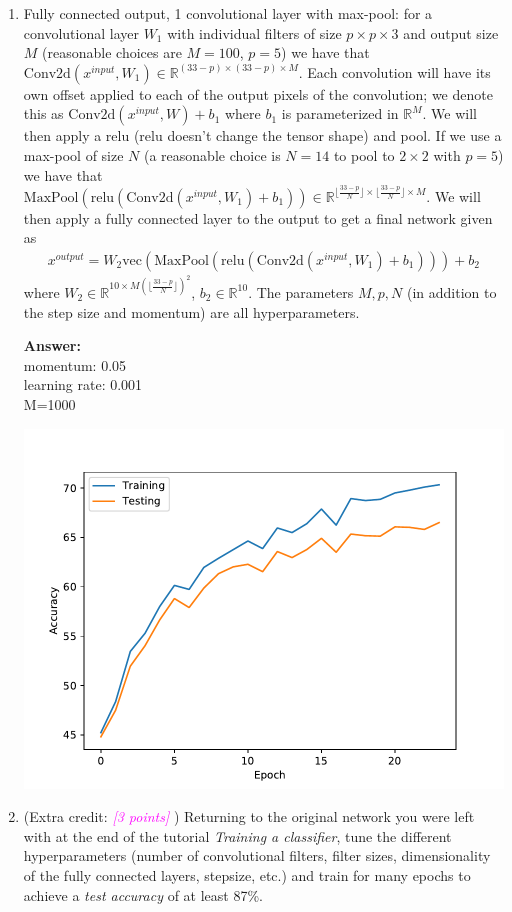\documentclass{article}
\newcommand{\field}[1]{\mathbb{#1}}
\newcommand{\1}{\mathbf{1}}
\newcommand{\R}{\field{R}} %
\def\vec{\text{vec}}
\newcommand{\grade}[1]{\small\textcolor{magenta}{\emph{[#1 points]}} \normalsize}
\begin{document}
\begin{enumerate}
  \item Fully connected output, 1 convolutional layer with max-pool: for a convolutional layer $W_1$ with individual filters of size $p \times p \times 3$ and output size $M$ (reasonable choices are $M=100$, $p=5$) we have that $\mathrm{Conv2d}(x^{input}, W_1) \in \R^{(33-p) \times (33-p) \times M}$. 
  Each convolution will have its own offset applied to each of the output pixels of the convolution; we denote this as $\mathrm{Conv2d}(x^{input}, W) + b_1$ where $b_1$ is parameterized in $\R^M$.
  We will then apply a relu (relu doesn't change the tensor shape) and pool. 
  If we use a max-pool of size $N$ (a reasonable choice is $N=14$ to pool to $2 \times 2$ with $p=5$) we have that $\textrm{MaxPool}( \mathrm{relu}( \mathrm{Conv2d}(x^{input}, W_1)+b_1)) \in \R^{\lfloor\frac{33-p}{N}\rfloor \times \lfloor\frac{33-p}{N}\rfloor \times M}$.
  We will then apply a fully connected layer to the output to get a final network given as
  \begin{align*}
  x^{output} = W_2 \vec(\textrm{MaxPool}( \mathrm{relu}( \mathrm{Conv2d}(x^{input}, W_1)+b_1))) + b_2
  \end{align*}
  where $W_2 \in \R^{10 \times M (\lfloor\frac{33-p}{N}\rfloor)^2}$, $b_2 \in \R^{10}$.
  The parameters $M,p,N$ (in addition to the step size and momentum) are all hyperparameters.
  
   \textbf{Answer:}\\
  momentum: 0.05\\
  learning rate: 0.001\\
  M=1000
  
  \includegraphics[]{3_convNet.pdf}
  
  \item (Extra credit: \grade{3}) Returning to the original network you were left with at the end of the tutorial \emph{Training a classifier}, tune the different hyperparameters (number of convolutional filters, filter sizes, dimensionality of the fully connected layers, stepsize, etc.) and train for many epochs to achieve a \emph{test accuracy} of at least 87\%. 
\end{enumerate}
\end{document}

